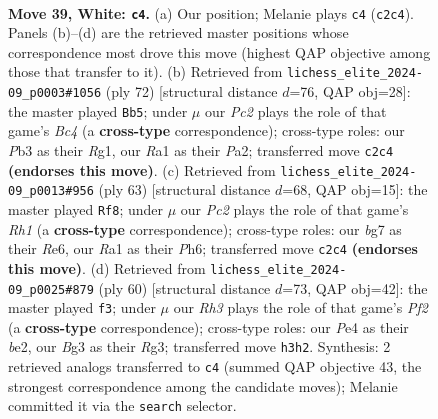 \documentclass[11pt]{article}
\begin{document}
\clearpage

\begin{figure}[p]\centering
\begin{subfigure}{0.46\textwidth}\centering
\resizebox{\linewidth}{!}{%
\newchessgame
\chessboard[
  setfen={6r1/rn3kbp/p2p2p1/4p1P1/Pp2P2P/1P3PBR/2PK2B1/R7 w - - 1 39},
  showmover=false,
  pgfstyle=straightmove, color=movearrow, markmove={c2-c4}
]}
\caption{}
\end{subfigure}\hfill
\begin{subfigure}{0.46\textwidth}\centering
\resizebox{\linewidth}{!}{%
\newchessgame
\chessboard[
  setfen={8/1b2r3/5nk1/p1p1rppp/2B5/1PNRP1PP/P4K2/6R1 w - - 0 37},
  showmover=false,
  pgfstyle=straightmove, color=movearrow, markmove={c4-b5}
]}
\caption{}
\end{subfigure}
\\[4pt]
\begin{subfigure}{0.46\textwidth}\centering
\resizebox{\linewidth}{!}{%
\newchessgame
\chessboard[
  setfen={2k4r/2p5/1p1prp1p/p3p3/P1P1P1b1/2PP2P1/3K1R1P/5RN1 b - - 7 32},
  showmover=false,
  pgfstyle=straightmove, color=movearrow, markmove={h8-f8}
]}
\caption{}
\end{subfigure}\hfill
\begin{subfigure}{0.46\textwidth}\centering
\resizebox{\linewidth}{!}{%
\newchessgame
\chessboard[
  setfen={6k1/1p3rp1/4p2p/2PpP1p1/p7/P3B1RP/1P2bPPK/8 w - - 0 31},
  showmover=false,
  pgfstyle=straightmove, color=movearrow, markmove={f2-f3}
]}
\caption{}
\end{subfigure}
\caption{\textbf{Move 39, White: \texttt{c4}.} (a) Our position; Melanie plays \texttt{c4} (\texttt{c2c4}). Panels (b)--(d) are the retrieved master positions whose correspondence most drove this move (highest QAP objective among those that transfer to it). (b) Retrieved from \texttt{lichess\_elite\_2024-09\_p0003\#1056} (ply 72) [structural distance $d$=76, QAP obj=28]: the master played \texttt{Bb5}; under $\mu$ our \emph{Pc2} plays the role of that game's \emph{Bc4} (a \textbf{cross-type} correspondence); cross-type roles: our \emph{P}b3 as their \emph{R}g1, our \emph{R}a1 as their \emph{P}a2; transferred move \texttt{c2c4} \textbf{(endorses this move)}. (c) Retrieved from \texttt{lichess\_elite\_2024-09\_p0013\#956} (ply 63) [structural distance $d$=68, QAP obj=15]: the master played \texttt{Rf8}; under $\mu$ our \emph{Pc2} plays the role of that game's \emph{Rh1} (a \textbf{cross-type} correspondence); cross-type roles: our \emph{b}g7 as their \emph{R}e6, our \emph{R}a1 as their \emph{P}h6; transferred move \texttt{c2c4} \textbf{(endorses this move)}. (d) Retrieved from \texttt{lichess\_elite\_2024-09\_p0025\#879} (ply 60) [structural distance $d$=73, QAP obj=42]: the master played \texttt{f3}; under $\mu$ our \emph{Rh3} plays the role of that game's \emph{Pf2} (a \textbf{cross-type} correspondence); cross-type roles: our \emph{P}e4 as their \emph{b}e2, our \emph{B}g3 as their \emph{R}g3; transferred move \texttt{h3h2}. Synthesis: 2 retrieved analogs transferred to \texttt{c4} (summed QAP objective 43, the strongest correspondence among the candidate moves); Melanie committed it via the \texttt{search} selector.}
\label{fig:thought-m76}
\end{figure}
\end{document}

